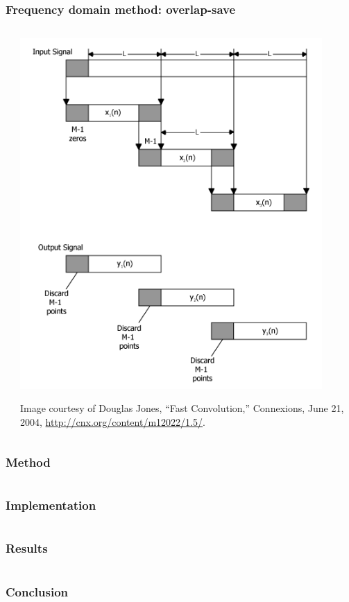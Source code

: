 \documentclass{beamer}
\begin{document}
\begin{frame}
	\frametitle{Frequency domain method: overlap-save}
	\begin{columns}
		\begin{column}{0.5\textwidth}
		\end{column}
		\begin{column}{0.5\textwidth}
			\includegraphics[width=0.9\textwidth]{figures/overlap-save}
			\begin{flushright}
				\scriptsize{Image courtesy of Douglas Jones, ``Fast Convolution,'' Connexions, June 21, 2004, \url{http://cnx.org/content/m12022/1.5/}.}
			\end{flushright}
		\end{column}
	\end{columns}
\end{frame}


\begin{frame}
\frametitle{Method}
\end{frame}


\section[Implementation]{}


\begin{frame}
\frametitle{Implementation}
\end{frame}


\section[Results]{}


\begin{frame}
\frametitle{Results}
\end{frame}


\section[Conclusion]{}


\begin{frame}
\frametitle{Conclusion}
\end{frame}
\end{document}
